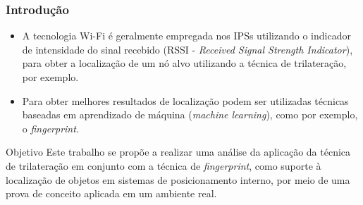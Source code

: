 \documentclass[xcolor={dvipsnames,svgnames,table}]{beamer}
\begin{document}
	\begin{frame}
		\frametitle{Introdução}
		\begin{itemize}[label=\textcolor{black}{\textbullet}, left=0pt]
			\justifying
			\item {\footnotesize A tecnologia Wi-Fi é geralmente empregada nos IPSs utilizando o indicador de intensidade do sinal recebido (RSSI - \textit{Received Signal Strength Indicator}), para obter a localização de um nó alvo utilizando a técnica de trilateração, por exemplo.} %
			
			\item {\footnotesize Para obter melhores resultados de localização podem ser utilizadas técnicas baseadas em aprendizado de máquina (\textit{machine learning}), como por exemplo, o \textit{fingerprint}.}
			
			
			
			
		\end{itemize}
		\begin{block}{Objetivo}
			\justifying
			Este trabalho se propõe a realizar uma análise da aplicação da técnica de trilateração em conjunto com a técnica de \textit{fingerprint}, como suporte à localização de objetos em sistemas de posicionamento interno, por meio de uma prova de conceito aplicada em um ambiente real.
		\end{block}
	\end{frame}
	
\end{document}
